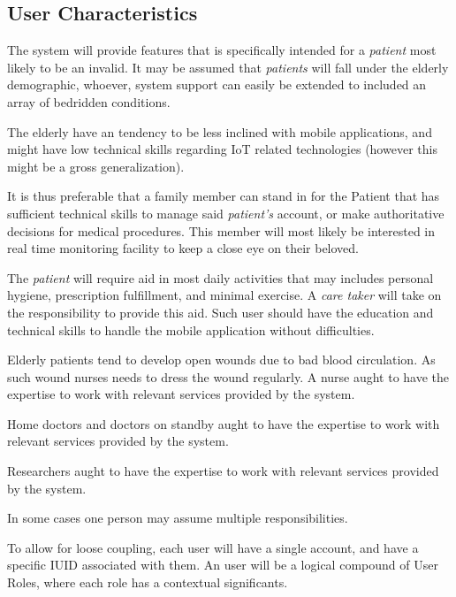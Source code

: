 \subsection{User Characteristics}

The system will provide features that is specifically intended for a \textit{patient} most likely to be an invalid. It may be assumed that \textit{patients} will fall under the elderly demographic, whoever, system support can easily be extended to included an array of bedridden conditions.

The elderly have an tendency to be less inclined with mobile applications, and might have low technical skills regarding IoT related technologies (however this might be a gross generalization).

It is thus preferable that a family member can stand in for the Patient that has sufficient technical skills to manage said \textit{patient's} account, or make authoritative decisions for medical procedures. This member will most likely be interested in real time monitoring facility to keep a close eye on their beloved.

The \textit{patient} will require aid in most daily activities that may includes personal hygiene, prescription fulfillment, and minimal exercise. A \textit{care taker} will take on the responsibility to provide this aid. Such user should have the education and technical skills to handle the mobile application without difficulties.

Elderly patients tend to develop open wounds due to bad blood circulation. As such wound nurses needs to dress the wound regularly. A nurse aught to have the expertise to work with relevant services provided by the system.

Home doctors and doctors on standby aught to have the expertise to work with relevant services provided by the system.

Researchers aught to have the expertise to work with relevant services provided by the system.

In some cases one person may assume multiple responsibilities.

To allow for loose coupling, each user will have a single account, and have a specific IUID associated with them. An user will be a logical compound of User Roles, where each role has a contextual significants.

